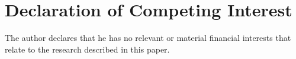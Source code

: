 \documentclass{article}
\begin{document}


\section{Declaration of Competing Interest}
The author declares that he has no relevant or material financial interests that relate to the research described in this paper.
\end{document}
